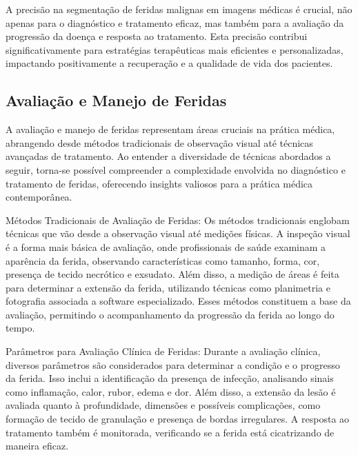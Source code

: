 A precisão na segmentação de feridas malignas em imagens médicas é crucial, não apenas para o diagnóstico e tratamento eficaz, mas também para a avaliação da progressão da doença e resposta ao tratamento. Esta precisão contribui significativamente para estratégias terapêuticas mais eficientes e personalizadas, impactando positivamente a recuperação e a qualidade de vida dos pacientes.

\subsection{Avaliação e Manejo de Feridas}

A avaliação e manejo de feridas representam áreas cruciais na prática médica, abrangendo desde métodos tradicionais de observação visual até técnicas avançadas de tratamento. Ao entender a diversidade de técnicas abordados a seguir, torna-se possível compreender a complexidade envolvida no diagnóstico e tratamento de feridas, oferecendo insights valiosos para a prática médica contemporânea.

Métodos Tradicionais de Avaliação de Feridas: Os métodos tradicionais englobam técnicas que vão desde a observação visual até medições físicas. A inspeção visual é a forma mais básica de avaliação, onde profissionais de saúde examinam a aparência da ferida, observando características como tamanho, forma, cor, presença de tecido necrótico e exsudato. Além disso, a medição de áreas é feita para determinar a extensão da ferida, utilizando técnicas como planimetria e fotografia associada a software especializado. Esses métodos constituem a base da avaliação, permitindo o acompanhamento da progressão da ferida ao longo do tempo.

Parâmetros para Avaliação Clínica de Feridas: Durante a avaliação clínica, diversos parâmetros são considerados para determinar a condição e o progresso da ferida. Isso inclui a identificação da presença de infecção, analisando sinais como inflamação, calor, rubor, edema e dor. Além disso, a extensão da lesão é avaliada quanto à profundidade, dimensões e possíveis complicações, como formação de tecido de granulação e presença de bordas irregulares. A resposta ao tratamento também é monitorada, verificando se a ferida está cicatrizando de maneira eficaz.

